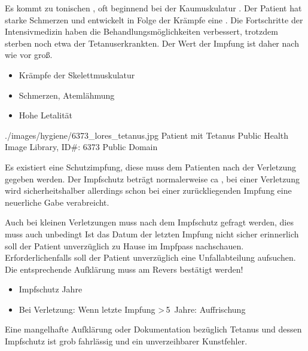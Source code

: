 \TextSlidePicture
{\TxSymptome}%
{%
Es kommt zu tonischen , oft beginnend bei der
Kaumuskulatur . Der Patient hat starke Schmerzen
und entwickelt in Folge der Krämpfe eine . 
Die Fortschritte der
Intensivmedizin haben die Behandlungsmöglichkeiten
verbessert, trotzdem sterben noch etwa \PC*
der Tetanuserkrankten. Der Wert der
Impfung ist daher nach wie vor groß.}%
{
\begin{itemize}
  \item Krämpfe der Skelettmuskulatur
  \item Schmerzen, Atemlähmung
  \item Hohe Letalität
\end{itemize}}%
{./images/hygiene/6373_lores_tetanus.jpg}%
{Patient mit Tetanus}%
{}%
{Public Health Image Library, ID\#: 6373}%
{Public Domain}%


{
\label{topic:tetanus-impfschutz}
Es existiert eine Schutzimpfung, diese muss dem Patienten
 nach der Verletzung gegeben werden. Der
Impfschutz beträgt normalerweise ca , bei einer
Verletzung wird sicherheitshalber allerdings schon bei einer
 zurückliegenden Impfung eine
neuerliche Gabe verabreicht.

Auch bei kleinen Verletzungen muss nach dem Impfschutz
gefragt werden, dies muss auch unbedingt  Ist das Datum der letzten Impfung nicht sicher
erinnerlich soll der Patient unverzüglich zu Hause im
Impfpass nachschauen. Erforderlichenfalls soll der Patient
unverzüglich eine Unfallabteilung aufsuchen.
Die entsprechende Aufklärung muss am Revers bestätigt werden!
}
{
\begin{itemize}
  \item Impfschutz  Jahre
  \item Bei Verletzung: Wenn letzte Impfung >\,5~Jahre:
  Auffrischung
\end{itemize}
}
{}
{}
{}

\begin{Danger}
  \item Eine mangelhafte Aufklärung oder Dokumentation
  bezüglich Tetanus und dessen Impfschutz ist grob fahrlässig und ein unverzeihbarer
  Kunstfehler.
\end{Danger}




